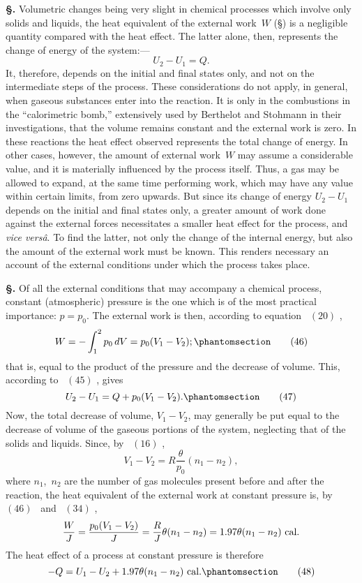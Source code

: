 \documentclass[12pt]{book}[2005/09/16]
\newcommand{\Chg}[2]{#2}
\newcommand{\Add}[1]{\Chg{}{#1}}
\newcommand{\Section}[1]{
  \medskip\par\textbf{§\;#1}
  \label{section:#1}
}
\newcommand{\SecRef}[2][§\;]{\hyperref[section:#2.]{{\upshape #1#2}}}
\newcommand{\Tag}[1]{%
  \phantomsection\label{eqn:#1}\tag*{\ensuremath{#1}}%
}
\newcommand{\Eq}[1]{%
  \hyperref[eqn:#1]{\ensuremath{#1}}%
}
\newcommand{\PageSep}[1]{\ignorespaces}
\newcommand{\Unit}[1]{\text{\upshape #1}}
\begin{document}
\Section{98.} Volumetric changes being very slight in chemical
processes which involve only solids and liquids, the heat
equivalent of the external work~$W$ (\SecRef{93}) is a negligible
\PageSep{71}
quantity compared with the heat effect. The latter alone,
%
then, represents the change of energy of the system\Add{:}---
\[
U_{2} - U_{1} = Q.
\]
It, therefore, depends on the initial and final states only,
and not on the intermediate steps of the process. These
considerations do not apply, in general, when gaseous substances
enter into the reaction. It is only in the combustions
in the ``calorimetric bomb,'' extensively used by Berthelot
%
%
and Stohmann in their investigations, that the volume
%
remains constant and the external work is zero. In these
reactions the heat effect observed represents the total change
of energy. In other cases, however, the amount of external
work~$W$ may assume a considerable value, and it is
materially influenced by the process itself. Thus, a gas may
be allowed to expand, at the same time performing work,
which may have any value within certain limits, from zero
upwards. But since its change of energy $U_{2} - U_{1}$ depends
on the initial and final states only, a greater amount of work
done against the external forces necessitates a smaller heat
effect for the process, and \textit{vice versâ}. To find the latter, not
only the change of the internal energy, but also the amount
of the external work must be known. This renders necessary
an account of the external conditions under which the process
takes place.

\Section{99.} Of all the external conditions that may accompany
a chemical process, constant (atmospheric) pressure is the
one which is of the most practical importance: $p = p_{0}$. The
external work is then, according to equation~\Eq{(20)},
\[
W = -\int_{1}^{2} p_{0}\, dV = p_{0} (V_{1} - V_{2});
\Tag{(46)}
\]
that is, equal to the product of the pressure and the decrease
of volume. This, according to~\Eq{(45)}, gives
\[
U_{2} - U_{1} = Q + p_{0} (V_{1} - V_{2}).
\Tag{(47)}
\]
Now, the total decrease of volume, $V_{1} - V_{2}$, may generally
\PageSep{72}
be put equal to the decrease of volume of the gaseous
portions of the system, neglecting that of the solids and
liquids. Since, by~\Eq{(16)},
\[
V_{1} - V_{2} = R \frac{\theta}{p_{0}} (n_{1} - n_{2}),
\]
where $n_{1}$,~$n_{2}$ are the number of gas molecules present before
and after the reaction, the heat equivalent of the external
work at constant pressure is, by \Eq{(46)}~and~\Eq{(34)},
\[
\frac{W}{J}
  = \frac{p_{0} (V_{1} - V_{2})}{J}
  = \frac{R}{J} \theta (n_{1} - n_{2})
  = 1.97 \theta (n_{1} - n_{2})~\Unit{cal.}
\]
The heat effect of a process at constant pressure is
therefore
\[
-Q = U_{1} - U_{2} + 1.97 \theta (n_{1} - n_{2})~\Unit{cal.}
\Tag{(48)}
\]
\end{document}
